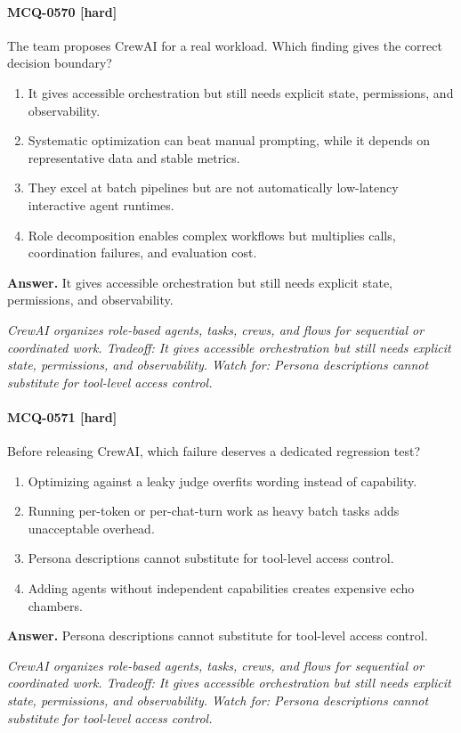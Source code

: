 \paragraph{MCQ-0570 [hard]} The team proposes CrewAI for a real workload. Which finding gives the correct decision boundary?
\begin{enumerate}[label=\Alph*.]
\item It gives accessible orchestration but still needs explicit state, permissions, and observability.
\item Systematic optimization can beat manual prompting, while it depends on representative data and stable metrics.
\item They excel at batch pipelines but are not automatically low-latency interactive agent runtimes.
\item Role decomposition enables complex workflows but multiplies calls, coordination failures, and evaluation cost.
\end{enumerate}
\noindent\textbf{Answer.} It gives accessible orchestration but still needs explicit state, permissions, and observability.
\par\textit{CrewAI organizes role-based agents, tasks, crews, and flows for sequential or coordinated work. Tradeoff: It gives accessible orchestration but still needs explicit state, permissions, and observability. Watch for: Persona descriptions cannot substitute for tool-level access control.}
\paragraph{MCQ-0571 [hard]} Before releasing CrewAI, which failure deserves a dedicated regression test?
\begin{enumerate}[label=\Alph*.]
\item Optimizing against a leaky judge overfits wording instead of capability.
\item Running per-token or per-chat-turn work as heavy batch tasks adds unacceptable overhead.
\item Persona descriptions cannot substitute for tool-level access control.
\item Adding agents without independent capabilities creates expensive echo chambers.
\end{enumerate}
\noindent\textbf{Answer.} Persona descriptions cannot substitute for tool-level access control.
\par\textit{CrewAI organizes role-based agents, tasks, crews, and flows for sequential or coordinated work. Tradeoff: It gives accessible orchestration but still needs explicit state, permissions, and observability. Watch for: Persona descriptions cannot substitute for tool-level access control.}

